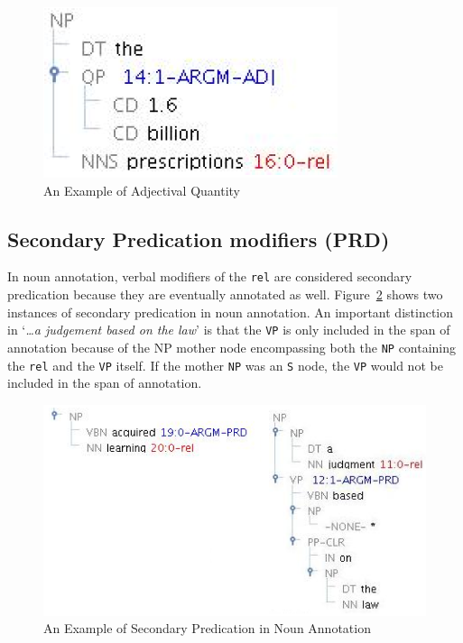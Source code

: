 \documentclass[11pt]{report}
\begin{document}
\begin{figure}[htbp]
\centering
\includegraphics[scale=0.4]{img/quantity.png}
\caption{An Example of Adjectival Quantity}
\label{fig: quantity}
\end{figure}

\subsection{Secondary Predication modifiers (PRD)}
\label{ssec: PRDnouns}
In noun annotation, verbal modifiers of the \texttt{rel} are considered secondary predication because they are eventually annotated as well. Figure~\ref{fig: nounPRD} shows two instances of secondary predication in noun annotation. An important distinction in `\textit{\ldots a judgement based on the law}' is that the \texttt{VP} is only included in the span of annotation because of the NP mother node encompassing both the \texttt{NP} containing the \texttt{rel} and the \texttt{VP} itself. If the mother \texttt{NP} was an \texttt{S} node, the \texttt{VP} would not be included in the span of annotation. 

\begin{figure}[htbp]
\centering
\includegraphics[scale=0.374]{img/nounPRD.png}
\caption{An Example of Secondary Predication in Noun Annotation}
\label{fig: nounPRD}
\end{figure}
\end{document}
